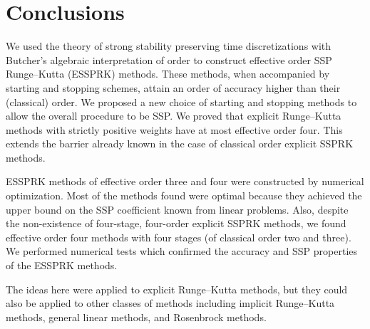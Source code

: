 \section{Conclusions}\label{sec:Conclusion}
We used the theory of strong stability preserving time discretizations
with Butcher's algebraic interpretation of order to construct
effective order SSP Runge--Kutta (ESSPRK) methods. 
These methods, when accompanied by starting and stopping
schemes, attain an order of accuracy higher than their (classical) order.
We proposed a new choice of starting and stopping methods to allow the
overall procedure to be SSP.
We proved that explicit Runge--Kutta methods with strictly positive 
weights have at most effective order four. 
This extends the barrier already known in the case of classical order
explicit SSPRK methods.

ESSPRK methods of effective order three and four
were constructed by numerical optimization.
Most of the methods found were optimal because they achieved
the upper bound on the SSP coefficient known from linear
problems.
Also, despite the non-existence of four-stage, four-order explicit SSPRK methods, 
we found effective order four methods with four stages (of classical 
order two and three). 
We performed numerical tests which confirmed the accuracy and
SSP properties of the ESSPRK methods.

The ideas here were applied to explicit Runge--Kutta methods, but they
could also be applied to other classes of methods including implicit
Runge--Kutta methods, general linear methods, and Rosenbrock methods.
